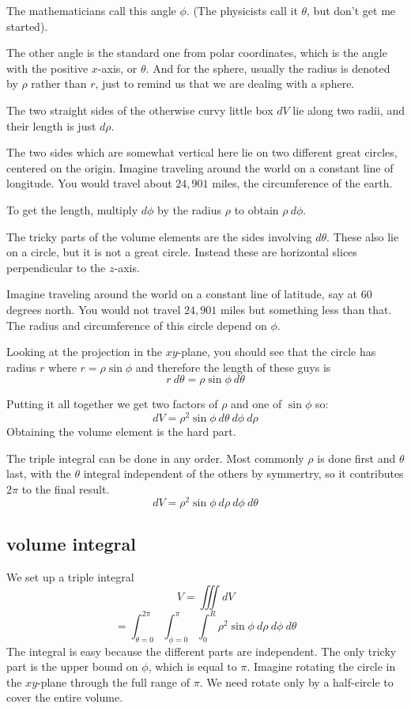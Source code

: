 \documentclass[11pt, oneside]{article}
\begin{document}
The mathematicians call this angle $\phi$.  (The physicists call it $\theta$, but don't get me started).

The other angle is the standard one from polar coordinates, which is the angle with the positive $x$-axis, or $\theta$.  And for the sphere, usually the radius is denoted by $\rho$ rather than $r$, just to remind us that we are dealing with a sphere.

The two straight sides of the otherwise curvy little box $dV$ lie along two radii, and their length is just $d \rho$.  

The two sides which are somewhat vertical here lie on two different great circles, centered on the origin.  Imagine traveling around the world on a constant line of longitude.  You would travel about $24,901$ miles, the circumference of the earth.

To get the length, multiply $d \phi$ by the radius $\rho$ to obtain $\rho \ d \phi$.  

The tricky parts of the volume elements are the sides involving $d \theta$.  These also lie on a circle, but it is not a great circle.  Instead these are horizontal slices perpendicular to the $z$-axis.  

Imagine traveling around the world on a constant line of latitude, say at $60$ degrees north.  You would not travel $24,901$ miles but something less than that.  The radius and circumference of this circle depend on $\phi$.

Looking at the projection in the $xy$-plane, you should see that the circle has radius $r$ where $r = \rho \sin \phi$ and therefore the length of these guys is
\[ r \ d \theta = \rho \sin \phi \ d \theta \]

Putting it all together we get two factors of $\rho$ and one of $\sin \phi$ so:
\[ dV = \rho^2 \sin \phi  \ d \theta \ d \phi \ d \rho \]
Obtaining the volume element is the hard part.

The triple integral can be done in any order.  Most commonly $\rho$ is done first and $\theta$ last, with the $\theta$ integral independent of the others by symmertry, so it contributes $2 \pi$ to the final result.
\[ dV = \rho^2 \sin \phi  \ d \rho \ d \phi \ d \theta \]

\subsection*{volume integral}

We set up a triple integral
\[ V = \iiint dV \]
\[ = \int_{\theta = 0}^{2 \pi} \int_{\phi = 0}^{\pi}  \int_0^{R} \rho^2 \sin \phi  \ d \rho \ d \phi \ d \theta \]
The integral is easy because the different parts are independent.  The only tricky part is the upper bound on $\phi$, which is equal to $\pi$.  Imagine rotating the circle in the $xy$-plane through the full range of $\pi$.  We need rotate only by a half-circle to cover the entire volume.
\end{document}
